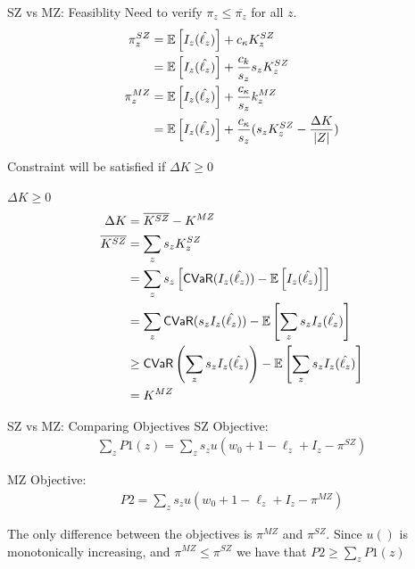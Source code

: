 \documentclass{beamer}
\def\bbe{{\Bbb{E}}}
\def\bbe{{\Bbb{E}}}
\begin{document}
\begin{frame}{SZ vs MZ: Feasiblity}
    Need to verify $\pi_z \leq \overline{\pi_z}$ for all $z$. 
    \begin{align*}
    \pi^{SZ}_z &= \bbe \left [ I_z(\hat{\ell_z}) \right ] + c_{\kappa} K^{SZ}_z\\
    &= \bbe \left [ I_z(\hat{\ell_z}) \right ] + \frac{c_{k}}{s_z}s_z K^{SZ}_z \\
    \pi^{MZ}_z &= \bbe \left [ I_z(\hat{\ell_z}) \right ] +  \frac{c_{\kappa}}{s_z} k^{MZ}_z\\
    &= \bbe \left [ I_z(\hat{\ell_z}) \right ] +  \frac{c_{\kappa}}{s_z} (s_z K^{SZ}_z - \frac{\Delta K}{|Z|})
\end{align*}

Constraint will be satisfied if $\Delta K \geq 0$ 
\end{frame}

\begin{frame}{$\Delta K \geq 0$}
    \begin{align*}
        \Delta K &= \overline{K^{SZ}} - K^{MZ}\\
        \overline{K^{SZ}} &= \sum_z s_z K^{SZ}_z \\
        &= \sum_z s_z \left [ {\sf CVaR}(I_z(\hat{\ell_z}) ) - \bbe \left [ I_z(\hat{\ell_z})  \right ] \right ] \\
        &= \sum_z {\sf CVaR}(s_z I_z(\hat{\ell_z}) ) - \bbe \left [ \sum_z s_z I_z(\hat{\ell_z})  \right ] \\
        &\geq {\sf CVaR} \left (\sum_z s_z I_z(\hat{\ell_z}) \right ) - \bbe \left [ \sum_z s_z I_z(\hat{\ell_z})  \right ] \\
        &= K^{MZ}
    \end{align*}
\end{frame}

\begin{frame}{SZ vs MZ: Comparing Objectives}
    SZ Objective:
    \begin{align*}
        \sum_z P1(z) = \sum_z s_z u(w_0 + 1 - \ell_z + I_z - \pi^{SZ})
    \end{align*}

    MZ Objective:
    \begin{align*}
        P2 = \sum_z s_z u(w_0 + 1 - \ell_z + I_z - \pi^{MZ})
    \end{align*}
    
    The only difference between the objectives is $\pi^{MZ}$ and $\pi^{SZ}$. Since $u()$ is monotonically increasing, and $\pi^{MZ} \leq \pi^{SZ}$ we have that $P2 \geq \sum_z P1(z)$
    
\end{frame}
\end{document}
